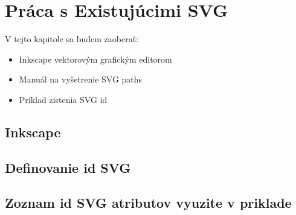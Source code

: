 \chapter{Práca s Existujúcimi SVG}

V tejto kapitole sa budem zaoberať: 
\begin{itemize}
	\item Inkscape vektorovým grafickým editorom
	\item Manuál na vyšetrenie SVG paths
	\item Príklad zistenia SVG id
\end{itemize}


\section{Inkscape}
\section{Definovanie id SVG}
\section{Zoznam id SVG atributov vyuzite v priklade}